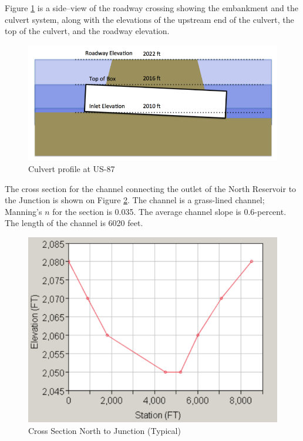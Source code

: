 \documentclass[12pt]{article}
\begin{document}
\begin{enumerate}
\newpage
Figure \ref{fig:Culvert Profile} is a side–view of the roadway crossing showing the embankment and the
culvert system, along with the elevations of the upstream end of the culvert, the top of
the culvert, and the roadway elevation.

\begin{figure}[h!] %
   \centering
   \includegraphics[width=6in]{CulvertProfile.png} 
   \caption{Culvert profile at US-87}
   \label{fig:Culvert Profile}
\end{figure}

\clearpage

The cross section for the channel connecting the outlet of the North Reservoir to the Junction is shown on Figure \ref{fig:CS_North}. The channel is a grass-lined
channel; Manning’s $n$ for the section is 0.035. The average channel slope is 0.6-percent. The length of the channel is 6020 feet.

\begin{figure}[h!] %
   \centering
   \includegraphics[width=6in]{CS_North.png} 
   \caption{Cross Section North to Junction (Typical)}
   \label{fig:CS_North}
\end{figure}


\end{enumerate}
\end{document}
